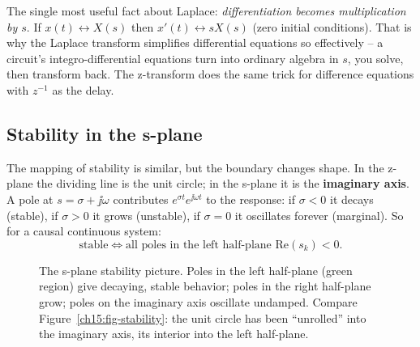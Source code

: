 \begin{happeningbox}
The single most useful fact about Laplace: \emph{differentiation becomes multiplication by
$s$}. If $x(t)\leftrightarrow X(s)$ then $x'(t)\leftrightarrow sX(s)$ (zero initial
conditions). That is why the Laplace transform simplifies differential equations so effectively -- a circuit's
integro-differential equations turn into ordinary algebra in $s$, you solve, then
transform back. The z-transform does the same trick for difference equations with
$z^{-1}$ as the delay.
\end{happeningbox}

\subsection{Stability in the s-plane}

The mapping of stability is similar, but the boundary changes shape. In the
z-plane the dividing line is the unit circle; in the s-plane it is the \textbf{imaginary
axis}. A pole at $s=\sigma+\jj\omega$ contributes $e^{\sigma t}e^{\jj\omega t}$ to the
response: if $\sigma<0$ it decays (stable), if $\sigma>0$ it grows (unstable), if
$\sigma=0$ it oscillates forever (marginal). So for a causal continuous system:
\[
  \text{stable} \iff \text{all poles in the left half-plane } \mathrm{Re}(s_k)<0.
\]

\begin{figure}[H]
\centering
{}
\caption{The s-plane stability picture. Poles in the left half-plane (green region) give
decaying, stable behavior; poles in the right half-plane grow; poles on the imaginary
axis oscillate undamped. Compare Figure~\ref{ch15:fig-stability}: the unit circle has
been ``unrolled'' into the imaginary axis, its interior into the left half-plane.}
\label{ch15:fig-splane}
\end{figure}

